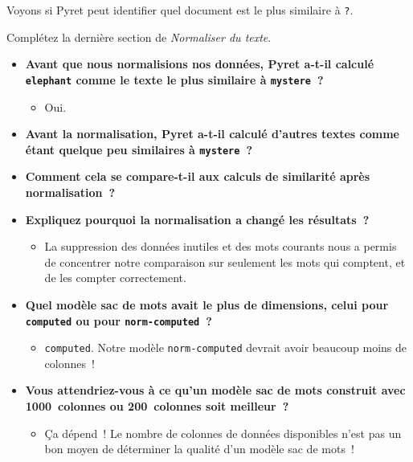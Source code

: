 \documentclass[12pt,a4paper]{article}
\begin{document}
\begin{activitybox}
  Voyons si Pyret peut identifier quel document est le plus similaire à \texttt{?}.

  Complétez la dernière section de \emph{Normaliser du texte}.
\end{activitybox}

\begin{thinkbox}
  \begin{itemize}
    \item \textbf{Avant que nous normalisions nos données, Pyret a-t-il calculé \texttt{elephant} comme le texte le plus similaire à \texttt{mystere}~?}
    \begin{itemize}
      \item Oui.
    \end{itemize}
    \item \textbf{Avant la normalisation, Pyret a-t-il calculé d'autres textes comme étant quelque peu similaires à \texttt{mystere}~?}
    \item \textbf{Comment cela se compare-t-il aux calculs de similarité après normalisation~?}
    \item \textbf{Expliquez pourquoi la normalisation a changé les résultats~?}
    \begin{itemize}
      \item La suppression des données inutiles et des mots courants nous a permis de concentrer notre comparaison sur seulement les mots qui comptent, et de les compter correctement.
    \end{itemize}
    \item \textbf{Quel modèle sac de mots avait le plus de dimensions, celui pour \texttt{computed} ou pour \texttt{norm-computed}~?}
    \begin{itemize}
      \item \texttt{computed}. Notre modèle \texttt{norm-computed} devrait avoir beaucoup moins de colonnes~!
    \end{itemize}
    \item \textbf{Vous attendriez-vous à ce qu'un modèle sac de mots construit avec 1000~colonnes ou 200~colonnes soit meilleur~?}
    \begin{itemize}
      \item Ça dépend~! Le nombre de colonnes de données disponibles n'est pas un bon moyen de déterminer la qualité d'un modèle sac de mots~!
    \end{itemize}
  \end{itemize}
\end{thinkbox}
\end{document}
